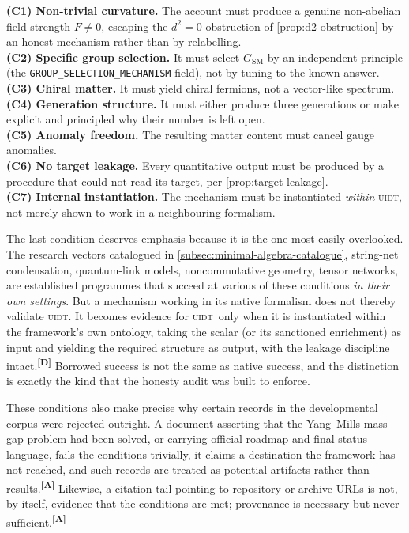 \documentclass[12pt,a4paper,twoside]{article}
\theoremstyle{plain}
\theoremstyle{definition}
\theoremstyle{remark}
\newcommand{\UIDT}{\textsc{uidt}}
\newcommand{\catmark}[1]{\textsuperscript{\textsf{\textbf{[#1]}}}}
\begin{document}
\begin{governancebox}
\textbf{(C1) Non-trivial curvature.} The account must produce a genuine non-abelian field strength $F \neq 0$, escaping the $d^2=0$ obstruction of
\cref{prop:d2-obstruction} by an honest mechanism rather than by relabelling.\\[0.3em]
\textbf{(C2) Specific group selection.} It must select $G_{\mathrm{SM}}$ by an independent principle (the \texttt{GROUP\_SELECTION\_MECHANISM} field), not by
tuning to the known answer.\\[0.3em]
\textbf{(C3) Chiral matter.} It must yield chiral fermions, not a vector-like
spectrum.\\[0.3em]
\textbf{(C4) Generation structure.} It must either produce three generations or
make explicit and principled why their number is left open.\\[0.3em]
\textbf{(C5) Anomaly freedom.} The resulting matter content must cancel gauge
anomalies.\\[0.3em]
\textbf{(C6) No target leakage.} Every quantitative output must be produced by a
procedure that could not read its target, per \cref{prop:target-leakage}.\\[0.3em]
\textbf{(C7) Internal instantiation.} The mechanism must be instantiated \emph{within} \UIDT, not merely shown to work in a neighbouring formalism.
\end{governancebox}

\noindent The last condition deserves emphasis because it is the one most easily overlooked. The research vectors catalogued in \cref{subsec:minimal-algebra-catalogue}, string-net condensation, quantum-link models, noncommutative geometry, tensor networks, are established programmes that succeed at various of these conditions \emph{in their own settings}. But a mechanism working in its native formalism does not thereby validate \UIDT. It becomes evidence for \UIDT\ only when it is instantiated within the framework's own ontology, taking the scalar (or its sanctioned enrichment) as input and yielding the required structure as output, with the leakage discipline intact.\catmark{D} Borrowed success is not the same as native success, and the distinction is exactly the kind that the honesty audit was built to enforce.

These conditions also make precise why certain records in the developmental corpus were rejected outright. A document asserting that the Yang--Mills mass-gap problem had been solved, or carrying official roadmap and final-status language, fails the conditions trivially, it claims a destination the framework has not reached, and such records are treated as potential artifacts rather than results.\catmark{A} Likewise, a citation tail pointing to repository or archive URLs is not, by itself, evidence that the conditions are met; provenance is necessary but never sufficient.\catmark{A}
\end{document}
